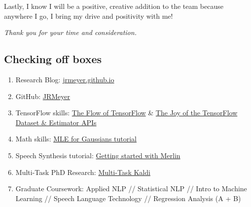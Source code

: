 \documentclass[12pt,a4paper]{article}
\begin{document}
Lastly, I know I will be a positive, creative addition to the team because anywhere I go, I bring my drive and positivity with me!

    
\begin{center}
\textit{Thank you for your time and consideration.}  
\end{center}



\newpage

\subsection*{Checking off boxes}

\begin{enumerate}

\item Research Blog: \href{http://jrmeyer.github.io}{jrmeyer.github.io}

\item GitHub: \href{https://github.com/JRMeyer}{JRMeyer}
  
\item TensorFlow skills: \href{http://jrmeyer.github.io/machinelearning/2016/02/01/TensorFlow-Tutorial.html}{The Flow of TensorFlow} \& \href{http://jrmeyer.github.io/machinelearning/2019/05/29/tensorflow-dataset-estimator-api.html}{The Joy of the TensorFlow Dataset \& Estimator APIs}
  
\item Math skills: \href{http://jrmeyer.github.io/machinelearning/2017/08/18/mle.html}{MLE for Gaussians tutorial}

\item Speech Synthesis tutorial: \href{http://jrmeyer.github.io/tts/2017/02/14/Installing-Merlin.html}{Getting started with Merlin}

\item Multi-Task PhD Research: \href{https://github.com/JRMeyer/multi-task-kaldi}{Multi-Task Kaldi}
  
\item Graduate Coursework: Applied NLP // Statistical NLP // Intro to Machine Learning // Speech Language Technology // Regression Analysis (A + B)

\end{enumerate}
\end{document}

